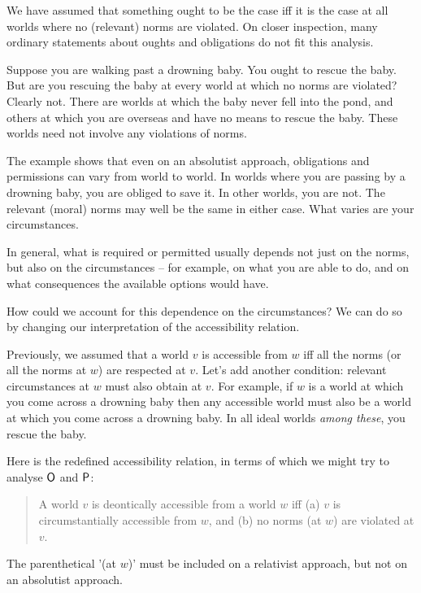 We have assumed that something ought to be the case iff it is the case at all
worlds where no (relevant) norms are violated. On closer inspection, many
ordinary statements about oughts and obligations do not fit this analysis.

Suppose you are walking past a drowning baby. You ought to rescue the baby. But
are you rescuing the baby at every world at which no norms are violated? Clearly
not. There are worlds at which the baby never fell into the pond, and others at
which you are overseas and have no means to rescue the baby. These worlds need
not involve any violations of norms.

The example shows that even on an absolutist approach, obligations and
permissions can vary from world to world. In worlds where you are passing by a
drowning baby, you are obliged to save it. In other worlds, you are not. The
relevant (moral) norms may well be the same in either case. What varies are your
circumstances.

In general, what is required or permitted usually depends not just on the norms,
but also on the circumstances -- for example, on what you are able to do, and
on what consequences the available options would have.


How could we account for this dependence on the circumstances? We can do so by
changing our interpretation of the accessibility relation.

Previously, we assumed that a world $v$ is accessible from $w$ iff all the norms
(or all the norms at $w$) are respected at $v$. Let's add another condition:
relevant circumstances at $w$ must also obtain at $v$. For example, if $w$ is a
world at which you come across a drowning baby then any accessible world must
also be a world at which you come across a drowning baby. In all ideal worlds
\emph{among these}, you rescue the baby.

Here is the redefined accessibility relation, in terms of which we might try to
analyse $\operatorname{\mathsf{O}}$ and $\operatorname{\mathsf{P}}$:
% 
\begin{quote}
  A world $v$ is deontically accessible from a world $w$ iff (a) $v$ is
  circumstantially accessible from $w$, and (b) no norms (at $w$) are violated
  at $v$.
\end{quote}
%
The parenthetical '(at $w$)' must be included on a relativist approach, but not
on an absolutist approach. 

